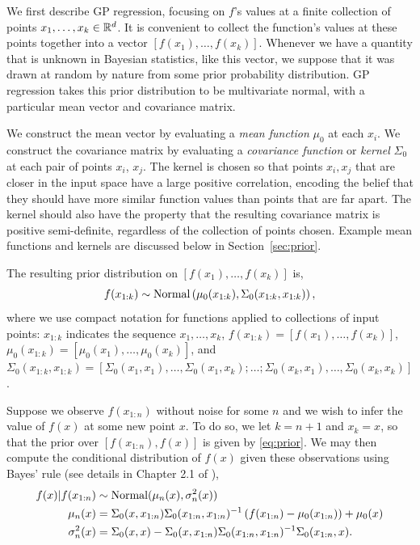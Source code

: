 \documentclass{article}
\begin{document}
We first describe GP regression, focusing on $f$'s values at a finite collection of points $x_1,\ldots,x_k \in \mathbb{R}^d$.  It is convenient to collect the function's values at these points together into a vector $[f(x_1),\ldots,f(x_k)]$.
Whenever we have a quantity that is unknown in Bayesian statistics, like this vector, we suppose that it was drawn at random by nature from some prior probability distribution.  
GP regression takes this prior distribution to be multivariate normal, with a particular mean vector and covariance matrix.

We construct the mean vector by evaluating a {\it mean function} $\mu_0$ at each $x_i$.  
We construct the covariance matrix by evaluating a {\it covariance function} or {\it kernel} $\Sigma_0$ at each pair of points $x_i$, $x_j$.  The kernel is chosen so that points $x_i,x_j$ that are closer in the input space have a large positive correlation, encoding the belief that they should have more similar function values than points that are far apart.  The kernel should also have the property that the resulting covariance matrix is positive semi-definite, regardless of the collection of points chosen.  %
Example mean functions and kernels are discussed below in Section~\ref{sec:prior}.


The resulting prior distribution on $[f(x_1),\ldots,f(x_k)]$ is,
\begin{equation}
f(x_{1:k}) \sim \mathrm{Normal}\left(\mu_0(x_{1:k}),\Sigma_0(x_{1:k},x_{1:k})\right), \label{eq:prior}
\end{equation}
where we use compact notation for functions applied to collections of input points: $x_{1:k}$
indicates the sequence $x_1,\ldots,x_k$,
$f(x_{1:k}) = [f(x_1),\ldots,f(x_k)]$, $\mu_0(x_{1:k}) = [\mu_0(x_1),\ldots,\mu_0(x_k)]$, and 
$\Sigma_0(x_{1:k},x_{1:k}) = [\Sigma_0(x_1,x_1), \ldots, \Sigma_0(x_1,x_k); \ldots; \Sigma_0(x_k,x_1), \ldots, \Sigma_0(x_k,x_k)]$.

Suppose we observe $f(x_{1:n})$ without noise for some $n$ and we wish to infer the value of $f(x)$ at some new point $x$.  To do so, we let $k=n+1$ and $x_{k} = x$, so that the prior over $[f(x_{1:n}), f(x)]$ is given by \eqref{eq:prior}.  We may then compute the conditional distribution of $f(x)$ given these observations using Bayes' rule (see details in Chapter 2.1 of \cite{RaWi06}),  
\begin{equation}
\begin{split}
\label{eq:posterior}
f(x) | f(x_{1:n}) &\sim \mathrm{Normal}(\mu_n(x), \sigma^2_n(x)) \\
\mu_n(x) &= \Sigma_0(x,x_{1:n}) \Sigma_0(x_{1:n},x_{1:n})^{-1} \left(f(x_{1:n}) - \mu_0(x_{1:n})\right) + \mu_0(x) \\
\sigma^2_n(x) &= 
\Sigma_0(x,x) - \Sigma_0(x,x_{1:n}) \Sigma_0(x_{1:n},x_{1:n})^{-1} \Sigma_0(x_{1:n},x).
\end{split}
\end{equation}
	
\end{document}
